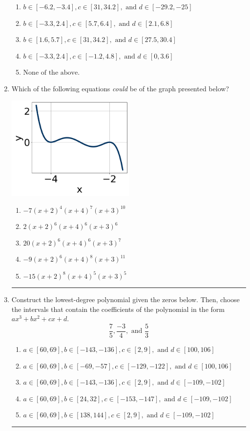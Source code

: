 \documentclass[14pt]{extbook}
\newcommand{\litem}[1]{\item#1\hspace*{-1cm}\rule{\textwidth}{0.4pt}}
\begin{document}
\begin{enumerate}
{\begin{enumerate}[label=\Alph*.]
\item \( b \in [-6.2, -3.4], c \in [31, 34.2], \text{ and } d \in [-29.2, -25] \)
\item \( b \in [-3.3, 2.4], c \in [5.7, 6.4], \text{ and } d \in [2.1, 6.8] \)
\item \( b \in [1.6, 5.7], c \in [31, 34.2], \text{ and } d \in [27.5, 30.4] \)
\item \( b \in [-3.3, 2.4], c \in [-1.2, 4.8], \text{ and } d \in [0, 3.6] \)
\item \( \text{None of the above.} \)

\end{enumerate} }
\litem{
Which of the following equations \textit{could} be of the graph presented below?
\begin{center}
    \includegraphics[width=0.5\textwidth]{../Figures/polyGraphToFunctionCopyA.png}
\end{center}
\begin{enumerate}[label=\Alph*.]
\item \( -7(x + 2)^{4} (x + 4)^{7} (x + 3)^{10} \)
\item \( 2(x + 2)^{6} (x + 4)^{6} (x + 3)^{6} \)
\item \( 20(x + 2)^{6} (x + 4)^{6} (x + 3)^{7} \)
\item \( -9(x + 2)^{6} (x + 4)^{8} (x + 3)^{11} \)
\item \( -15(x + 2)^{8} (x + 4)^{5} (x + 3)^{5} \)

\end{enumerate} }
\litem{
Construct the lowest-degree polynomial given the zeros below. Then, choose the intervals that contain the coefficients of the polynomial in the form $ax^3+bx^2+cx+d$.\[ \frac{7}{5}, \frac{-3}{4}, \text{ and } \frac{5}{3} \]\begin{enumerate}[label=\Alph*.]
\item \( a \in [60, 69], b \in [-143, -136], c \in [2, 9], \text{ and } d \in [100, 106] \)
\item \( a \in [60, 69], b \in [-69, -57], c \in [-129, -122], \text{ and } d \in [100, 106] \)
\item \( a \in [60, 69], b \in [-143, -136], c \in [2, 9], \text{ and } d \in [-109, -102] \)
\item \( a \in [60, 69], b \in [24, 32], c \in [-153, -147], \text{ and } d \in [-109, -102] \)
\item \( a \in [60, 69], b \in [138, 144], c \in [2, 9], \text{ and } d \in [-109, -102] \)

\end{enumerate} }
\end{enumerate}
\end{document}
